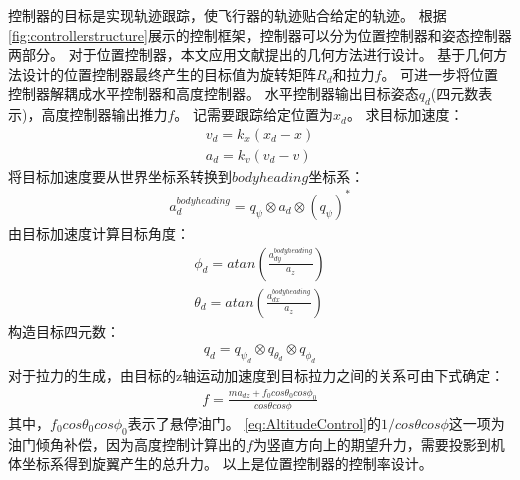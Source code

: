 \documentclass[
  type=master
]{gdutthesis}
\begin{document}
控制器的目标是实现轨迹跟踪，使飞行器的轨迹贴合给定的轨迹。
根据\autoref{fig:controllerstructure}展示的控制框架，控制器可以分为位置控制器和姿态控制器两部分。
对于位置控制器，本文应用文献\parencite{lee2010geometric}提出的几何方法进行设计。
基于几何方法设计的位置控制器最终产生的目标值为旋转矩阵$R_d$和拉力$f$。
可进一步将位置控制器解耦成水平控制器和高度控制器。
水平控制器输出目标姿态$q_d$(四元数表示)，高度控制器输出推力$f$。
记需要跟踪给定位置为$x_d$。
求目标加速度：
\begin{gather}
	v_d = k_x (x_d - x)\\
	a_d = k_v (v_d - v)
\end{gather}
将目标加速度要从世界坐标系转换到$bodyheading$坐标系：\vspace{1ex}
\begin{gather}
a_d^{bodyheading} = q_{\psi} \otimes a_d \otimes (q_{\psi})^{*}
\end{gather}
由目标加速度计算目标角度：
\begin{gather}
	\phi_d = atan(\frac{a_{dy}^{bodyheading}}{a_z})\\
	\theta_d = atan(\frac{a_{dx}^{bodyheading}}{a_z})
\end{gather}
构造目标四元数：
\begin{gather}
	q_d = q_{\psi_d} \otimes q_{\theta_d} \otimes q_{\phi_d}
\end{gather}
对于拉力的生成，由目标的z轴运动加速度到目标拉力之间的关系可由下式确定：\vspace{1ex}
\begin{gather}\label{eq:AltitudeControl}
	f = \frac{ma_{dz} + f_0 cos\theta_0 cos\phi_0}{cos\theta cos\phi}
\end{gather}
其中，$f_0 cos\theta_0 cos\phi_0$表示了悬停油门。
\autoref{eq:AltitudeControl}的$1/cos\theta cos\phi$这一项为油门倾角补偿，因为高度控制计算出的$f$为竖直方向上的期望升力，需要投影到机体坐标系得到旋翼产生的总升力。
以上是位置控制器的控制率设计。
\end{document}
